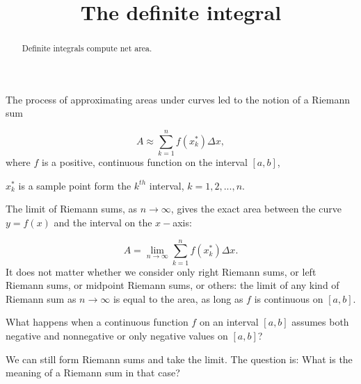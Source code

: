\documentclass{ximera}
\title[Dig-In:]{The definite integral}
\begin{document}
\begin{abstract}
  Definite integrals compute net area.
\end{abstract}
\maketitle




The process of approximating areas under curves led to the notion of a Riemann sum

\[
A\approx\sum_{k=1}^n f(x_k^*)\Delta x,
\]
where $f$ is a positive, continuous function on the interval $[a,b]$,

 $x_k^*$ is a sample point form the $k^{th}$ interval, $k=1,2,..., n$.
 
 The limit of Riemann sums, as $n\to\infty$, gives the exact area between the curve $y=f(x)$ and the interval on the $x-$axis:
 
\[
A=\lim_{n\to\infty}\sum_{k=1}^n f(x_k^*)\Delta x.
\]
It does not matter whether we consider only right Riemann sums, or left Riemann sums, or midpoint Riemann sums, or others: the limit of any kind of Riemann sum as $n\to\infty$  is equal to the area, as long as $f$ is continuous on $[a,b]$. 


 
What happens when a continuous function $f$ on an interval $[a,b]$ assumes both negative and nonnegative or only negative values  on $[a,b]$?

We can still form Riemann sums and take the limit. 
The question is: What is the meaning of a Riemann sum in that case?
\end{document}
